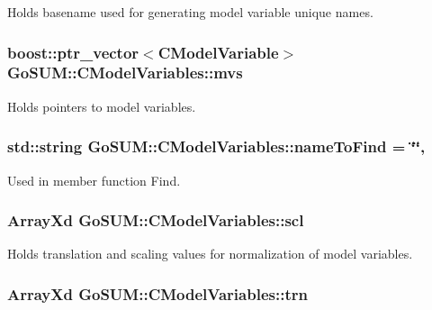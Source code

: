 Holds basename used for generating model variable unique names. 

\hypertarget{class_go_s_u_m_1_1_c_model_variables_a9ce0daf443666eb920bbbbdee00e1e37}{
\subsubsection[{mvs}]{\setlength{\rightskip}{0pt plus 5cm}boost\-::ptr\-\_\-vector$<${\bf C\-Model\-Variable}$>$ Go\-S\-U\-M\-::\-C\-Model\-Variables\-::mvs\hspace{0.3cm}{\ttfamily [protected]}}}\label{class_go_s_u_m_1_1_c_model_variables_a9ce0daf443666eb920bbbbdee00e1e37}


Holds pointers to model variables. 

\hypertarget{class_go_s_u_m_1_1_c_model_variables_aa295a3899598dab50afc56434eb7ace4}{
\subsubsection[{name\-To\-Find}]{\setlength{\rightskip}{0pt plus 5cm}std\-::string Go\-S\-U\-M\-::\-C\-Model\-Variables\-::name\-To\-Find = \char`\"{}\char`\"{}\hspace{0.3cm}{\ttfamily [static]}, {\ttfamily [protected]}}}\label{class_go_s_u_m_1_1_c_model_variables_aa295a3899598dab50afc56434eb7ace4}


Used in member function Find. 

\hypertarget{class_go_s_u_m_1_1_c_model_variables_a82725532f90f4b4c6c6bd6b4c25d20c3}{
\subsubsection[{scl}]{\setlength{\rightskip}{0pt plus 5cm}Array\-Xd Go\-S\-U\-M\-::\-C\-Model\-Variables\-::scl\hspace{0.3cm}{\ttfamily [protected]}}}\label{class_go_s_u_m_1_1_c_model_variables_a82725532f90f4b4c6c6bd6b4c25d20c3}
Holds translation and scaling values for normalization of model variables. \hypertarget{class_go_s_u_m_1_1_c_model_variables_a44c359c9aeda8913e9c93bdf133638dd}{
\subsubsection[{trn}]{\setlength{\rightskip}{0pt plus 5cm}Array\-Xd Go\-S\-U\-M\-::\-C\-Model\-Variables\-::trn\hspace{0.3cm}{\ttfamily [protected]}}}\label{class_go_s_u_m_1_1_c_model_variables_a44c359c9aeda8913e9c93bdf133638dd}


